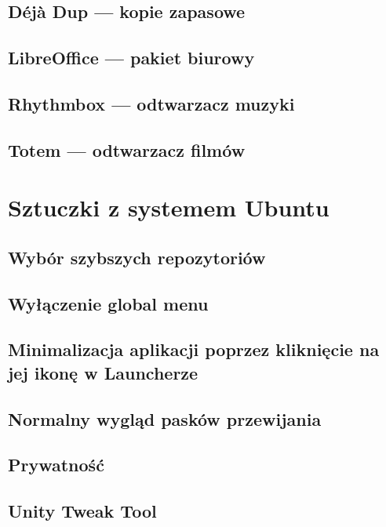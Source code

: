 \documentclass[a4paper,11pt,oneside]{mwart}
\begin{document}
		\subsection{Déjà Dup --- kopie zapasowe}
			
		\subsection{LibreOffice --- pakiet biurowy}
			
		\subsection{Rhythmbox --- odtwarzacz muzyki}
			
		\subsection{Totem --- odtwarzacz filmów}
						
	\section{Sztuczki z systemem Ubuntu}
		
		\subsection{Wybór szybszych repozytoriów}
			
		\subsection{Wyłączenie global menu}
			
		\subsection{Minimalizacja aplikacji poprzez kliknięcie na jej ikonę w Launcherze}
			
		\subsection{Normalny wygląd pasków przewijania}
			
		\subsection{Prywatność}
			
		\subsection{Unity Tweak Tool}
			
\end{document}
